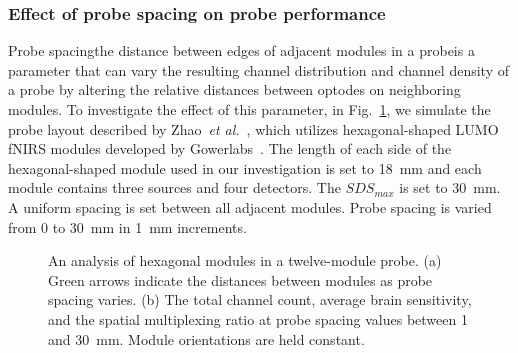 \subsubsection{Effect of probe spacing on probe performance}
Probe spacing\textemdash the distance between edges of adjacent modules in a probe\textemdash is a parameter that can vary the resulting channel distribution and channel density of a probe by altering the relative distances between optodes on neighboring modules. To investigate the effect of this parameter, in Fig.~\ref{fig:spacing}, we simulate the probe layout described by Zhao~\emph{et al.}~\cite{Zhao2019}, which utilizes hexagonal-shaped LUMO \ac{fNIRS} modules developed by Gowerlabs~\cite{Gowerlabs2019}. The length of each side of the hexagonal-shaped module used in our investigation is set to 18~mm and each module contains three sources and four detectors. The $SDS_{max}$ is set to 30~mm. A uniform spacing is set between all adjacent modules. Probe spacing is varied from 0 to 30~mm in 1~mm increments. 


\begin{figure}
\begin{center}
\end{center}
\caption {An analysis of hexagonal modules in a twelve-module probe. (a) Green arrows indicate the distances between modules as probe spacing varies. (b) The total channel count, average brain sensitivity, and the spatial multiplexing ratio at probe spacing values between 1 and 30~mm. Module orientations are held constant.} \label{fig:spacing}
\end{figure} 


